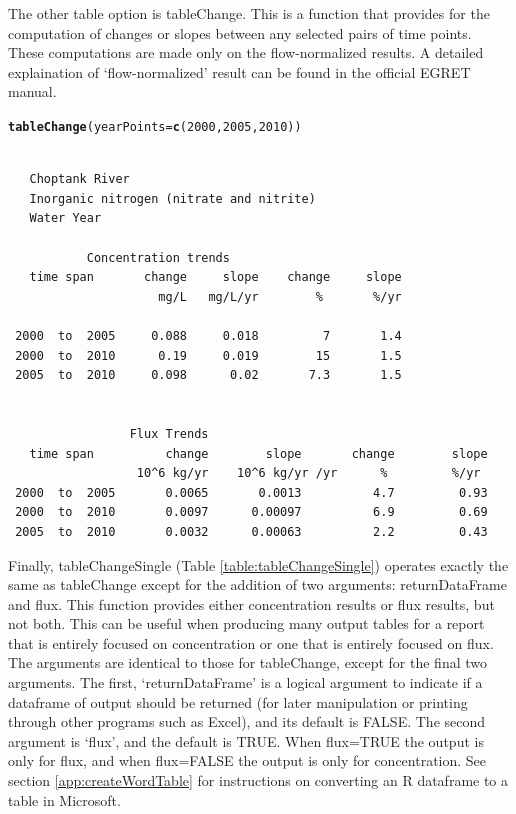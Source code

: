 \documentclass[a4paper,11pt]{article}\usepackage[]{graphicx}\usepackage[]{color}
\makeatletter
\newcommand{\hlnum}[1]{\textcolor[rgb]{0.686,0.059,0.569}{#1}}%
\newcommand{\hlstd}[1]{\textcolor[rgb]{0.345,0.345,0.345}{#1}}%
\newcommand{\hlkwc}[1]{\textcolor[rgb]{0.333,0.667,0.333}{#1}}%
\newcommand{\hlkwd}[1]{\textcolor[rgb]{0.737,0.353,0.396}{\textbf{#1}}}%
\newenvironment{kframe}{%
 \def\at@end@of@kframe{}%
 \ifinner\ifhmode%
  \def\at@end@of@kframe{\end{minipage}}%
  \begin{minipage}{\columnwidth}%
 \fi\fi%
 \def\FrameCommand##1{\hskip\@totalleftmargin \hskip-\fboxsep
 \colorbox{shadecolor}{##1}\hskip-\fboxsep
     \hskip-\linewidth \hskip-\@totalleftmargin \hskip\columnwidth}%
 \MakeFramed {\advance\hsize-\width
   \@totalleftmargin\z@ \linewidth\hsize
   \@setminipage}}%
 {\par\unskip\endMakeFramed%
 \at@end@of@kframe}
\newenvironment{knitrout}{}{} %
\makeatother
\begin{document}
The other table option is tableChange. This is a function that provides for the computation of changes or slopes between any selected pairs of time points.  These computations are made only on the flow-normalized results. A detailed explaination of `flow-normalized' result can be found in the official EGRET manual.


\begin{knitrout}
\color{fgcolor}\begin{kframe}
\begin{alltt}
\hlkwd{tableChange}\hlstd{(}\hlkwc{yearPoints}\hlstd{=}\hlkwd{c}\hlstd{(}\hlnum{2000}\hlstd{,}\hlnum{2005}\hlstd{,}\hlnum{2010}\hlstd{))}
\end{alltt}
\begin{verbatim}

   Choptank River 
   Inorganic nitrogen (nitrate and nitrite)
   Water Year 

           Concentration trends
   time span       change     slope    change     slope
                     mg/L   mg/L/yr        %       %/yr

 2000  to  2005     0.088     0.018         7       1.4
 2000  to  2010      0.19     0.019        15       1.5
 2005  to  2010     0.098      0.02       7.3       1.5


                 Flux Trends
   time span          change        slope       change        slope
                  10^6 kg/yr    10^6 kg/yr /yr      %         %/yr
 2000  to  2005       0.0065       0.0013          4.7         0.93
 2000  to  2010       0.0097      0.00097          6.9         0.69
 2005  to  2010       0.0032      0.00063          2.2         0.43
\end{verbatim}
\end{kframe}
\end{knitrout}

Finally, tableChangeSingle (Table \ref{table:tableChangeSingle}) operates exactly the same as tableChange except for the addition of two arguments: returnDataFrame and flux. This function provides either concentration results or flux results, but not both.  This can be useful when producing many output tables for a report that is entirely focused on concentration or one that is entirely focused on flux.  The arguments are identical to those for tableChange, except for the final two arguments.  The first, `returnDataFrame' is a logical argument to indicate if a dataframe of output should be returned (for later manipulation or printing through other programs such as Excel), and its default is FALSE.  The second argument is `flux', and the default is TRUE.  When flux=TRUE the output is only for flux, and when flux=FALSE the output is only for concentration.  See section \ref{app:createWordTable} for instructions on converting an R dataframe to a table in Microsoft.
\end{document}
